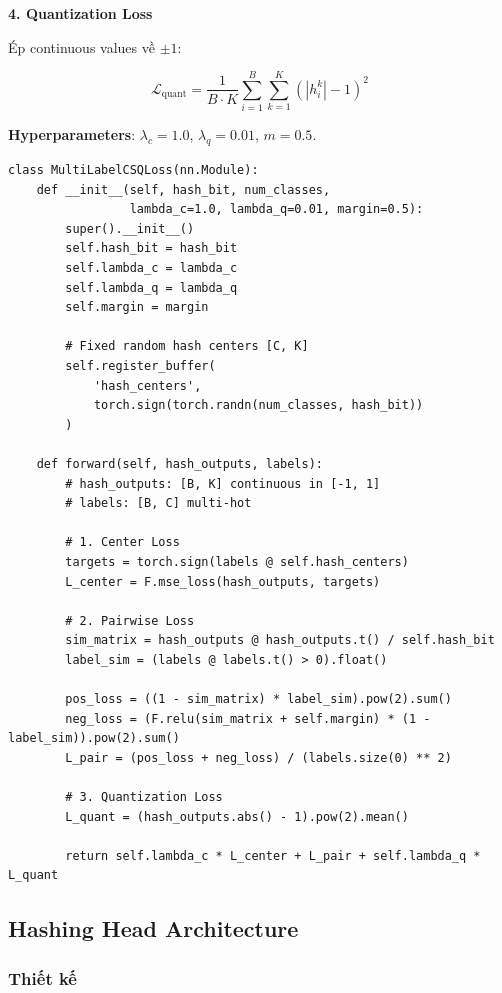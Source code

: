 \documentclass[12pt,a4paper]{article}
\begin{document}
\textbf{4. Quantization Loss}

Ép continuous values về $\pm 1$:

\begin{equation}
    \mathcal{L}_{\text{quant}} = \frac{1}{B \cdot K} \sum_{i=1}^{B} \sum_{k=1}^{K} (|h_i^k| - 1)^2
\end{equation}

\textbf{Hyperparameters}: $\lambda_c = 1.0$, $\lambda_q = 0.01$, $m = 0.5$.

\begin{lstlisting}[caption={CSQ Loss Implementation}]
class MultiLabelCSQLoss(nn.Module):
    def __init__(self, hash_bit, num_classes, 
                 lambda_c=1.0, lambda_q=0.01, margin=0.5):
        super().__init__()
        self.hash_bit = hash_bit
        self.lambda_c = lambda_c
        self.lambda_q = lambda_q
        self.margin = margin
        
        # Fixed random hash centers [C, K]
        self.register_buffer(
            'hash_centers',
            torch.sign(torch.randn(num_classes, hash_bit))
        )
    
    def forward(self, hash_outputs, labels):
        # hash_outputs: [B, K] continuous in [-1, 1]
        # labels: [B, C] multi-hot
        
        # 1. Center Loss
        targets = torch.sign(labels @ self.hash_centers)
        L_center = F.mse_loss(hash_outputs, targets)
        
        # 2. Pairwise Loss
        sim_matrix = hash_outputs @ hash_outputs.t() / self.hash_bit
        label_sim = (labels @ labels.t() > 0).float()
        
        pos_loss = ((1 - sim_matrix) * label_sim).pow(2).sum()
        neg_loss = (F.relu(sim_matrix + self.margin) * (1 - label_sim)).pow(2).sum()
        L_pair = (pos_loss + neg_loss) / (labels.size(0) ** 2)
        
        # 3. Quantization Loss
        L_quant = (hash_outputs.abs() - 1).pow(2).mean()
        
        return self.lambda_c * L_center + L_pair + self.lambda_q * L_quant
\end{lstlisting}

\subsection{Hashing Head Architecture}

\subsubsection{Thiết kế}
\end{document}
